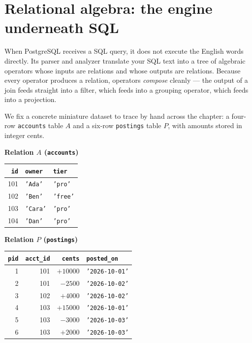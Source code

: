 \section{Relational algebra: the engine underneath SQL}
\label{sec:ch01-relational-algebra}

When PostgreSQL receives a SQL query, it does not execute the English words directly. Its parser and analyzer translate your SQL text into a tree of algebraic operators whose inputs are relations and whose outputs are relations. Because every operator produces a relation, operators \emph{compose} cleanly --- the output of a join feeds straight into a filter, which feeds into a grouping operator, which feeds into a projection.

We fix a concrete miniature dataset to trace by hand across the chapter: a four-row \texttt{accounts} table $A$ and a six-row \texttt{postings} table $P$, with amounts stored in integer cents.

\begin{center}
\begin{minipage}[t]{0.44\textwidth}
\centering
\textbf{Relation $A$ (\texttt{accounts})}\\[4pt]
{\footnotesize
\begin{tabular}{rll}
\toprule
\texttt{id} & \texttt{owner} & \texttt{tier} \\
\midrule
101 & \texttt{'Ada'}  & \texttt{'pro'} \\
102 & \texttt{'Ben'}  & \texttt{'free'} \\
103 & \texttt{'Cara'} & \texttt{'pro'} \\
104 & \texttt{'Dan'}  & \texttt{'pro'} \\
\bottomrule
\end{tabular}}
\end{minipage}\hfill
\begin{minipage}[t]{0.53\textwidth}
\centering
\textbf{Relation $P$ (\texttt{postings})}\\[4pt]
{\footnotesize
\begin{tabular}{rrrl}
\toprule
\texttt{pid} & \texttt{acct\_id} & \texttt{cents} & \texttt{posted\_on} \\
\midrule
1 & 101 & $+10000$ & \texttt{'2026-10-01'} \\
2 & 101 &  $-2500$ & \texttt{'2026-10-02'} \\
3 & 102 &  $+4000$ & \texttt{'2026-10-02'} \\
4 & 103 & $+15000$ & \texttt{'2026-10-01'} \\
5 & 103 &  $-3000$ & \texttt{'2026-10-03'} \\
6 & 103 &  $+2000$ & \texttt{'2026-10-03'} \\
\bottomrule
\end{tabular}}
\end{minipage}
\end{center}

